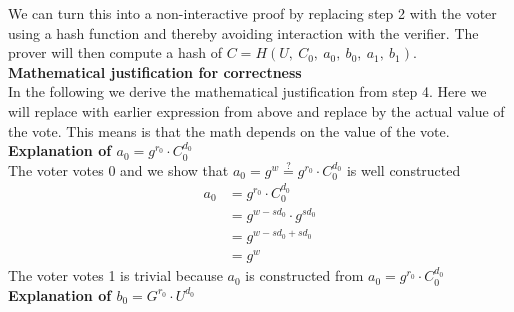 \noindent
We can turn this into a non-interactive proof by replacing step 2 with the voter using a hash function and thereby avoiding interaction with the verifier. The prover will then compute a hash of \begin{math}C=H(U,\ C_0,\ a_0,\ b_0,\ a_1,\ b_1) \end{math}.\\




\noindent
\textbf{Mathematical justification for correctness}\\
In the following we derive the mathematical justification from step 4. Here we will replace with earlier expression from above and replace by the actual value of the vote. This means is that the math depends on the value of the vote.\\

\noindent
\textbf{Explanation of \begin{math}a_0=g^{r_0}  \cdot  C^{d_0}_0\end{math}}\\

\noindent
The voter votes 0 and we show that \begin{math}a_0= g^w \stackrel{?}{=} g^{r_0}  \cdot  C^{d_0}_0 \end{math} is well constructed
\begin{align*}
    a_0 &=g^{r_0}  \cdot  C^{d_0}_0     \\ 
        &= g^{w-sd_0} \cdot  g^{sd_0}   \\
        &= g^{w-sd_0+ sd_0}             \\
        &= g^w                          
\end{align*}
The voter votes 1 is trivial because \begin{math}a_0 \end{math}  is constructed from \begin{math}a_0=g^{r_0}  \cdot  C^{d_0}_0 \end{math}\\



\noindent
\textbf{Explanation of \begin{math}b_0 = G^{r_0} \cdot U^{d_0}\end{math}}\\

